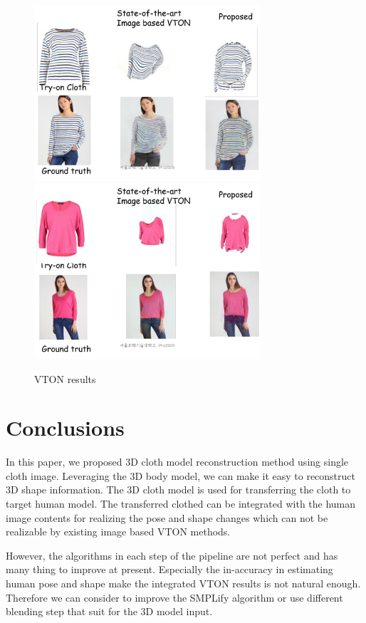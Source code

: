 \documentclass[runningheads]{llncs}
\begin{document}
\begin{figure}
\centering
\includegraphics[height=6.5cm]{figures/vton_result1.png} 
\includegraphics[height=6.5cm]{figures/vton_result2.png} 
\caption{VTON results}
\label{fig:vtonresults}
\end{figure}




\section{Conclusions}

In this paper, we proposed 3D cloth model reconstruction method using single cloth image. Leveraging the 3D body model, we can make it easy to reconstruct 3D shape information. The 3D cloth model is used for transferring the cloth to target human model.  The transferred clothed can be integrated with the human image contents for realizing the pose and shape changes which can not be realizable by existing image based VTON methods.

However, the algorithms in each step of the pipeline are not perfect and has many thing to improve at present. Especially the in-accuracy in estimating human pose and shape make the integrated VTON results is not natural enough. Therefore we can consider to improve the SMPLify algorithm or use different blending step that suit for the 3D model input.
     
\end{document}

